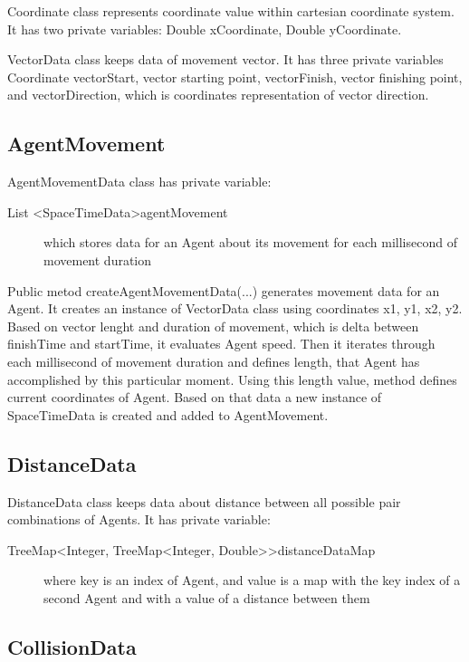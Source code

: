 \documentclass[thesis=B,english]{FITthesis}[2019/12/23]
\begin{document}
Coordinate class represents coordinate value within cartesian coordinate system. It has two private variables:
Double xCoordinate, Double  yCoordinate. 

VectorData class keeps data of movement vector. It has three private variables Coordinate vectorStart, vector starting point, vectorFinish, vector finishing point, and vectorDirection, which is coordinates representation of vector direction.

\subsection{AgentMovement}

AgentMovementData class has private variable:
\begin{description}
\item[List \textless SpaceTimeData\textgreater agentMovement] which stores data for an Agent about its movement for each millisecond of movement duration
\end{description}

Public metod createAgentMovementData(...) generates movement data for an Agent. It creates an instance of VectorData class using coordinates x1, y1, x2, y2. Based on vector lenght and duration of movement, which is delta between finishTime and startTime, it evaluates Agent speed. Then it iterates through each millisecond of movement duration and defines length, that Agent has accomplished by this particular moment. Using this length value, method defines current coordinates of Agent. Based on that data a new instance of SpaceTimeData is created and added to AgentMovement.

\subsection{DistanceData}

DistanceData class keeps data about distance between all possible pair combinations of Agents. It has private variable:
\begin{description}
\item[TreeMap\textless Integer, TreeMap\textless Integer, Double\textgreater\textgreater distanceDataMap] where key is an index of Agent, and value is a map with the key index of a second Agent and  with a value of a distance between them
\end{description}


\subsection{CollisionData}
\end{document}
